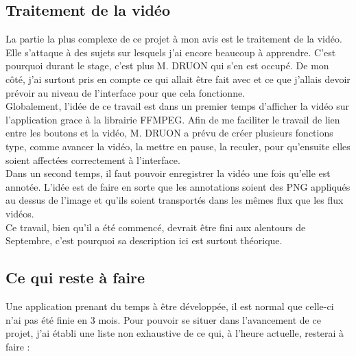 \documentclass[11pt,french,a4paper]{report}
\begin{document}
        \subsection{Traitement de la vidéo}
La partie la plus complexe de ce projet à mon avis est le traitement de la vidéo. Elle s'attaque à des sujets sur lesquels j'ai 
encore beaucoup à apprendre. C'est pourquoi durant le stage, c'est plus M. DRUON qui s'en est occupé. De mon côté, j'ai surtout
pris en compte ce qui allait être fait avec et ce que j'allais devoir prévoir au niveau de l'interface pour que cela fonctionne. \\

Globalement, l'idée de ce travail est dans un premier temps d'afficher la vidéo sur l'application grace à 
la librairie FFMPEG. Afin de me faciliter
le travail de lien entre les boutons et la vidéo, M. DRUON a prévu de créer plusieurs fonctions type, comme avancer la vidéo, la 
mettre en pause, la reculer, pour qu'ensuite elles soient affectées correctement à l'interface. \\

Dans un second temps, il faut pouvoir enregistrer la vidéo une fois qu'elle est annotée. L'idée est de faire en sorte que les annotations
soient des PNG appliqués au dessus de l'image et qu'ils soient transportés dans les mêmes flux que les flux vidéos. \\

Ce travail, bien qu'il a été commencé, devrait être fini aux alentours de Septembre, c'est pourquoi sa description ici
est surtout théorique. \\


        \subsection{Ce qui reste à faire}
Une application prenant du temps à être développée, il est normal que celle-ci n'ai pas été finie en 3 mois. Pour pouvoir se situer
dans l'avancement de ce projet, j'ai établi une liste non exhaustive de ce qui, à l'heure actuelle, resterai à faire : \\ 
\end{document}
